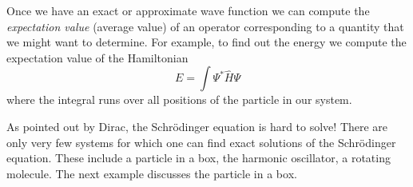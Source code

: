 \documentclass[../Main/chem371-notes.tex]{subfiles}
\begin{document}
Once we have an exact or approximate wave function we can compute the \emph{expectation value} (average value) of an operator corresponding to a quantity that we might want to determine.
For example, to find out the energy we compute the expectation value of the Hamiltonian
\begin{equation}
E = \int \Psi^* \hat{H} \Psi
\end{equation}
where the integral runs over all positions of the particle in our system.

As pointed out by Dirac, the Schr\"{o}dinger equation is hard to solve!
There are only very few systems for which one can find exact solutions of the Schr\"{o}dinger equation.
These include a particle in a box, the harmonic oscillator, a rotating molecule.
The next example discusses the particle in a box.
\end{document}
